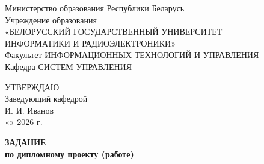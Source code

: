 \thispagestyle{empty}

\begin{center}
    Министерство образования Республики Беларусь \\
    Учреждение образования \\
    «БЕЛОРУССКИЙ ГОСУДАРСТВЕННЫЙ УНИВЕРСИТЕТ \\ 
    ИНФОРМАТИКИ И РАДИОЭЛЕКТРОНИКИ» \\
    \vspace{0.5cm}
    Факультет \underline{ИНФОРМАЦИОННЫХ ТЕХНОЛОГИЙ И УПРАВЛЕНИЯ} \\
    Кафедра \underline{СИСТЕМ УПРАВЛЕНИЯ} \\
    
    \vspace{1cm}
    
    \begin{flushright}
        \begin{minipage}{0.5\textwidth}
            УТВЕРЖДАЮ \\
            Заведующий кафедрой \\
            \underline{\hspace{3cm}} И. И. Иванов \\
            «\underline{\hspace{1cm}}» \underline{\hspace{3cm}} 2026 г.
        \end{minipage}
    \end{flushright}

    \vspace{0.8cm}
    {\bfseries ЗАДАНИЕ} \\
    {\bfseries по дипломному проекту (работе)}
\end{center}

